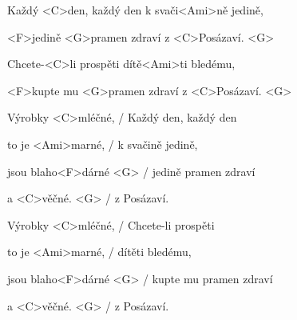 

\zs
Každý <C>den, každý den k svači<Ami>ně jedině,

<F>jedině <G>pramen zdraví z <C>Posázaví. <G>

Chcete-<C>li prospěti dítě<Ami>ti bledému,

<F>kupte mu <G>pramen zdraví z <C>Posázaví. <G>
\ks

\zr
Výrobky <C>mléčné, / Každý den, každý den

to je <Ami>marné, / k svačině jedině,

jsou blaho<F>dárné <G> / jedině pramen zdraví

a <C>věčné. <G> / z Posázaví.

Výrobky <C>mléčné, / Chcete-li prospěti

to je <Ami>marné, / dítěti bledému,

jsou blaho<F>dárné <G> / kupte mu pramen zdraví

a <C>věčné. <G> / z Posázaví.

\kr

\zr \kr
\kp


















